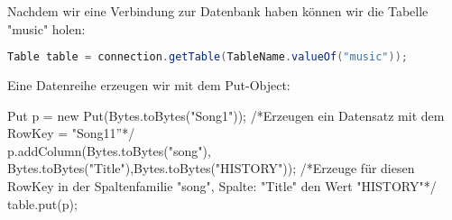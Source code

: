 Nachdem wir eine Verbindung zur Datenbank haben können wir die Tabelle "music" holen:

\begin{lstlisting}[language=Java]
Table table = connection.getTable(TableName.valueOf("music"));
\end{lstlisting}

Eine Datenreihe erzeugen wir mit dem Put-Object:

Put p = new Put(Bytes.toBytes("Song1"));
/*Erzeugen ein Datensatz mit dem RowKey = "Song11''*/
\\p.addColumn(Bytes.toBytes("song"), Bytes.toBytes("Title"),Bytes.toBytes("HISTORY"));
/*Erzeuge für diesen RowKey in der Spaltenfamilie "song", Spalte: "Title" den Wert "HISTORY"*/
\\table.put(p);
